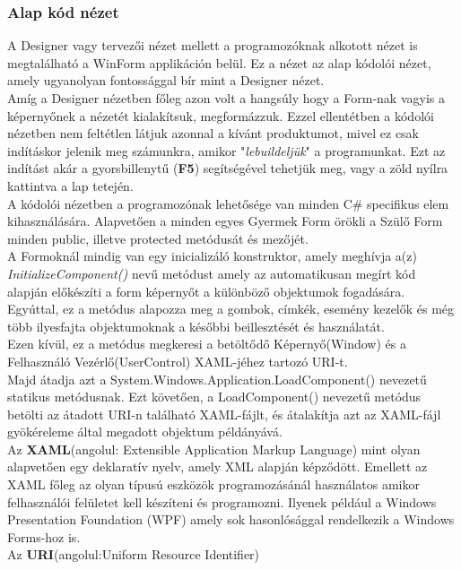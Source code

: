 \documentclass[tocnopagenum]{thesis-ekf}
\theoremstyle{definition}
\theoremstyle{remark}
\begin{document}
	\subsubsection*{Alap kód nézet}
	A Designer vagy tervezői nézet mellett a programozóknak alkotott nézet is megtalálható a WinForm applikáción belül. Ez a nézet az alap kódolói nézet, amely ugyanolyan fontossággal bír mint a Designer nézet.
	\\
	Amíg a Designer nézetben főleg azon volt a hangsúly hogy a Form-nak vagyis a képernyőnek a nézetét kialakítsuk, megformázzuk. Ezzel ellentétben a kódolói nézetben nem feltétlen látjuk azonnal a kívánt produktumot, mivel ez csak indításkor jelenik meg számunkra, amikor "\textit{lebuildeljük}" a programunkat. Ezt az indítást akár a gyorsbillenytű (\textbf{F5}) segítségével tehetjük meg, vagy a zöld nyílra kattintva a lap tetején.
	\\
	A kódolói nézetben a programozónak lehetősége van minden C\# specifikus elem kihasználására. Alapvetően a minden egyes Gyermek Form örökli a Szülő Form minden public, illetve protected metódusát és mezőjét. 
	\\
	A Formoknál mindig van egy inicializáló konstruktor, amely meghívja a(z) \textit{
	InitializeComponent()} nevű metódust amely az automatikusan megírt kód alapján előkészíti a form képernyőt a különböző objektumok fogadására. Egyúttal, ez a metódus alapozza meg a gombok, címkék, esemény kezelők és még több ilyesfajta objektumoknak a későbbi beillesztését és használatát.
\\
Ezen kívül, ez a metódus megkeresi a betöltődő Képernyő(Window) és a Felhasználó Vezérlő(UserControl) XAML-jéhez tartozó URI-t.
\\
Majd átadja azt a System.Windows.Application.LoadComponent() nevezetű statikus metódusnak.
Ezt követően, a LoadComponent() nevezetű metódus betölti az átadott URI-n található XAML-fájlt, és átalakítja azt az XAML-fájl gyökéreleme által megadott objektum példányává.
\\
Az \textbf{XAML}(angolul: Extensible Application Markup Language) mint olyan alapvetően egy deklaratív nyelv, amely XML alapján képződött.
Emellett az XAML főleg az olyan típusú eszközök programozásánál használatos amikor felhasználói felületet kell készíteni és programozni. Ilyenek például a Windows Presentation Foundation (WPF) amely sok hasonlósággal rendelkezik a Windows Forms-hoz is.
\\
Az \textbf{URI}(angolul:Uniform Resource Identifier) \cite{uri}
\\
\end{document}
